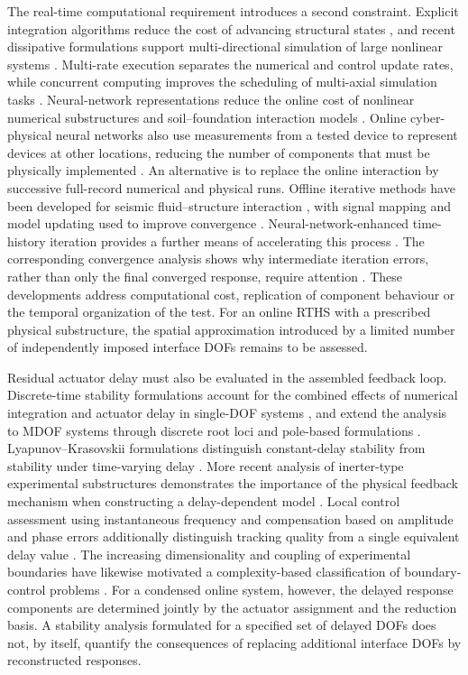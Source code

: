 \documentclass[a4paper,fleqn,review,12pt]{cas-sc}
\numberwithin{equation}{section}
\begin{document}
The real-time computational requirement introduces a second constraint. Explicit integration algorithms reduce the cost of advancing structural states \cite{ChenCR2008}, and recent dissipative formulations support multi-directional simulation of large nonlinear systems \cite{AlSubCD2024}. Multi-rate execution separates the numerical and control update rates, while concurrent computing improves the scheduling of multi-axial simulation tasks \cite{TaoMulti2024,Sudvarg2024}. Neural-network representations reduce the online cost of nonlinear numerical substructures and soil--foundation interaction models \cite{ChenNN2024,AlSubNN2024}. Online cyber-physical neural networks also use measurements from a tested device to represent devices at other locations, reducing the number of components that must be physically implemented \cite{MalikNN2025}. An alternative is to replace the online interaction by successive full-record numerical and physical runs. Offline iterative methods have been developed for seismic fluid--structure interaction \cite{HuOffline2024}, with signal mapping and model updating used to improve convergence \cite{HuIntegrated2025,HuSequence2025}. Neural-network-enhanced time-history iteration provides a further means of accelerating this process \cite{Peng2025}. The corresponding convergence analysis shows why intermediate iteration errors, rather than only the final converged response, require attention \cite{HuangGreen2026}. These developments address computational cost, replication of component behaviour or the temporal organization of the test. For an online RTHS with a prescribed physical substructure, the spatial approximation introduced by a limited number of independently imposed interface DOFs remains to be assessed.

Residual actuator delay must also be evaluated in the assembled feedback loop. Discrete-time stability formulations account for the combined effects of numerical integration and actuator delay in single-DOF systems \cite{ChenStability2008}, and extend the analysis to MDOF systems through discrete root loci and pole-based formulations \cite{Zhu2015,Li2021}. Lyapunov--Krasovskii formulations distinguish constant-delay stability from stability under time-varying delay \cite{Huang2019}. More recent analysis of inerter-type experimental substructures demonstrates the importance of the physical feedback mechanism when constructing a delay-dependent model \cite{TaoInerter2025}. Local control assessment using instantaneous frequency and compensation based on amplitude and phase errors additionally distinguish tracking quality from a single equivalent delay value \cite{XuInst2024,XuAmp2025}. The increasing dimensionality and coupling of experimental boundaries have likewise motivated a complexity-based classification of boundary-control problems \cite{Zhan2026}. For a condensed online system, however, the delayed response components are determined jointly by the actuator assignment and the reduction basis. A stability analysis formulated for a specified set of delayed DOFs does not, by itself, quantify the consequences of replacing additional interface DOFs by reconstructed responses.
\end{document}
